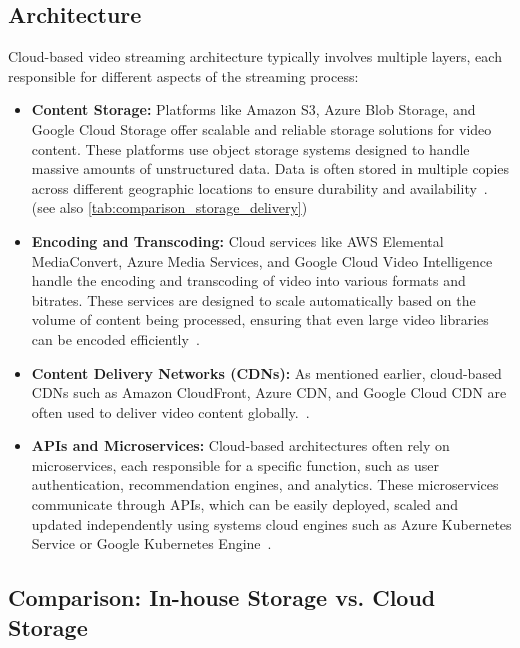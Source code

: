 \subsection{Architecture}
Cloud-based video streaming architecture typically involves multiple layers, each responsible for different aspects of the streaming process:

\begin{itemize}
    \item \textbf{Content Storage:} Platforms like Amazon S3, Azure Blob Storage, and Google Cloud Storage offer scalable and reliable storage solutions for video content. These platforms use object storage systems designed to handle massive amounts of unstructured data. Data is often stored in multiple copies across different geographic locations to ensure durability and availability~\parencite{cloud_streaming}. (see also \autoref{tab:comparison_storage_delivery})
    
    \item \textbf{Encoding and Transcoding:} Cloud services like AWS Elemental MediaConvert, Azure Media Services, and Google Cloud Video Intelligence handle the encoding and transcoding of video into various formats and bitrates. These services are designed to scale automatically based on the volume of content being processed, ensuring that even large video libraries can be encoded efficiently~\parencite{cloud_streaming}.
    
    \item \textbf{Content Delivery Networks (CDNs):} As mentioned earlier, cloud-based \ac{CDN}s such as Amazon CloudFront, Azure CDN, and Google Cloud CDN are often used to deliver video content globally.~\parencite{cloud_streaming}.
    
    \item \textbf{\ac{API}s and Microservices:} Cloud-based architectures often rely on microservices, each responsible for a specific function, such as user authentication, recommendation engines, and analytics. These microservices communicate through \ac{API}s, which can be easily deployed, scaled and updated independently using systems cloud engines such as Azure Kubernetes Service or Google Kubernetes Engine~\parencite{cloud_streaming}.
\end{itemize}

\subsection{Comparison: In-house Storage vs. Cloud Storage}

